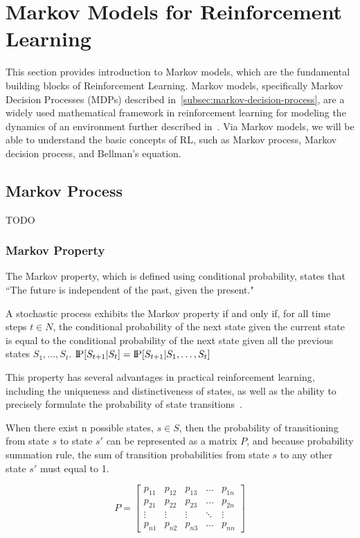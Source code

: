 \documentclass[../xlapes02]{subfiles}
\begin{document}
    \section{Markov Models for Reinforcement Learning}\label{sec:markov-models-for-rl}
    This section provides introduction to Markov models, which are the fundamental building blocks of Reinforcement Learning. Markov models, specifically Markov Decision Processes (MDPs) described in~\cref{subsec:markov-decision-process}, are a widely used mathematical framework in reinforcement learning for modeling the dynamics of an environment further described in~. Via Markov models, we will be able to understand the basic concepts of RL, such as Markov process, Markov decision process, and Bellman's equation.

    \subsection{Markov Process}\label{subsec:markov-process}
    TODO

    \subsubsection{Markov Property}\label{subsubsec:markov-property}
    The Markov property, which is defined using conditional probability, states that ``The future is independent of the past, given the present."

    A stochastic process exhibits the Markov property if and only if, for all time steps $t \in N$, the conditional probability of the next state given the current state is equal to the conditional probability of the next state given all the previous states $S_1, \ldots, S_t$. $\text{I\kern-0.15em P}[S_{t+1}|S_t] = \text{I\kern-0.15em P}[S_{t+1}|S_1,\ldots,S_t]$

    This property has several advantages in practical reinforcement learning, including the uniqueness and distinctiveness of states, as well as the ability to precisely formulate the probability of state transitions~\cite{FITMT25127}.

    When there exist n possible states, $s\in S$, then the probability of transitioning from state $s$ to state $s'$ can be represented as a matrix $P$, and because probability summation rule, the sum of transition probabilities from state $s$ to any other state $s'$ must equal to 1.

    \begin{equation}
        P=\begin{bmatrix}
              p_{11} & p_{12} & p_{13} & \dots  & p_{1n} \\
              p_{21} & p_{22} & p_{23} & \dots  & p_{2n} \\
              \vdots & \vdots & \vdots & \ddots & \vdots \\
              p_{n1} & p_{n2} & p_{n3} & \dots  & p_{nn}
        \end{bmatrix}
    \end{equation}
\end{document}

